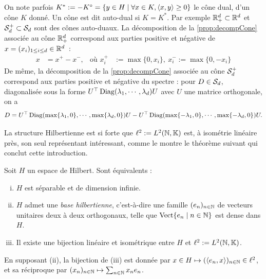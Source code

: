 \begin{exemple}
\label{ex:coneSdp}
%
	On note parfois $K^* := - K^\circ  = \{y \in H\mid \forall x \in K, \langle x,y\rangle \geq 0\}$ le cône dual, d'un cône $K$ donné. 
	Un cône est dit auto-dual si $K = K^*$. Par exemple $\mathbb{R}_+^d \subset \mathbb{R}^d$ et $\mathcal{S}_d^+ \subset \mathcal{S}_d$ sont des cônes auto-duaux. La décomposition de la \cref{prop:decompCone} associée au cône $\mathbb{R}_+^d$ correspond aux parties positive et négative de $x=(x_i)_{1 \leq i \leq d} \in \mathbb{R}^d$~: 
	\begin{align*}
		x &= x^+ - x^-, &\text{où } x^+_i &:= \max\{0,x_i\},\ x^-_i := \max\{0,-x_i\}
	\end{align*}
	De même, la décomposition de la \cref{prop:decompCone} associée au cône $\mathcal{S}_d^+$ correspond aux parties positive et négative du spectre : pour $D \in \mathcal{S}_d$, diagonalisée sous la forme $U^\top \operatorname{Diag}(\lambda_1,\cdots,\lambda_d) U$ avec $U$ une matrice orthogonale, on a 
	\begin{equation*}
		D  
		= U^\top \operatorname{Diag}(\max \{\lambda_1,0\},\cdots,\max \{\lambda_d,0\}) U - U^\top \operatorname{Diag}(\max \{-\lambda_1,0\},\cdots,\max \{-\lambda_d,0\}) U.
	\end{equation*}
\end{exemple}



La structure Hilbertienne est si forte que $\ell^2 := L^2(\mathbb{N},\mathbb{K})$ est, à isométrie linéaire près, son seul représentant intéressant, comme le montre le théorème suivant qui conclut cette introduction. 

\begin{theorem}
\label{th:baseHilbert}
%
Soit $H$ un espace de Hilbert. Sont équivalents : 
\begin{enumerate}[(i)]
	\item $H$ est séparable et de dimension infinie.
	\item $H$ admet une \emph{base hilbertienne}, c'est-à-dire une famille $(e_n)_{n\in \mathbb{N}}$ de vecteurs unitaires deux à deux orthogonaux, telle que $\operatorname{Vect}\{e_n \mid n \in \mathbb{N}\}$ est dense dans $H$.
	\item Il existe une bijection linéaire et isométrique entre $H$ et $\ell^2 := L^2(\mathbb{N},\mathbb{K})$.
\end{enumerate}
En supposant (ii), la bijection de (iii) est donnée par $x \in H \mapsto (\langle e_n,x\rangle)_{n \in \mathbb{N}} \in \ell^2$, et sa réciproque par $(x_n)_{n \in \mathbb{N}} \mapsto \sum_{n \in \mathbb{N}} x_n e_n$.
\end{theorem}

